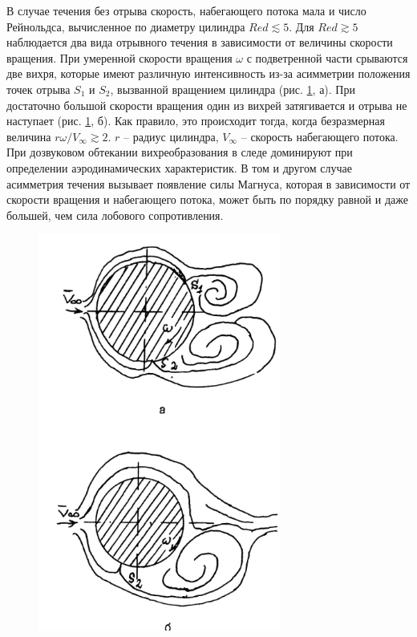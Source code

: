 \documentclass[specialist, subf, href, colorlinks=true, 14pt, final]{disser}
\theoremstyle{definition}
\begin{document}
В случае течения без отрыва скорость, набегающего потока мала и число Рейнольдса, вычисленное по диаметру цилиндра $Red \lesssim 5$. Для $Red \gtrsim 5$ наблюдается два вида отрывного течения в зависимости от величины скорости вращения. При умеренной скорости вращения $\omega$ с подветренной части срываются две вихря, которые имеют различную интенсивность из-за асимметрии положения точек отрыва $S_1$ и $S_2$, вызванной вращением цилиндра (рис. \ref{2-8-1}, а). При достаточно большой скорости вращения один из вихрей затягивается и отрыва не наступает (рис. \ref{2-8-1}, б). Как правило, это происходит тогда, когда безразмерная величина $r\omega / V_{\infty} \gtrsim 2$. $r$ -- радиус цилиндра, $V_{\infty}$ -- скорость набегающего потока. При дозвуковом обтекании вихреобразования в следе доминируют при определении аэродинамических характеристик. В том и другом случае асимметрия течения вызывает появление силы Магнуса, которая в зависимости от скорости вращения и набегающего потока, может быть по порядку равной и даже большей, чем сила лобового сопротивления.
\begin{figure} 
  \includegraphics[width=80mm]{pics/2-8-1.png}
  \caption{}
  \label{2-8-1}
\end{figure}
\end{document}
